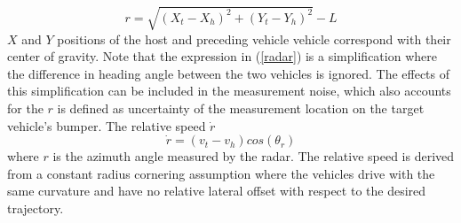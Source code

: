 \documentclass[letterpaper, 10pt, conference]{ieeeconf}  %
\def\eqref#1{(\ref{#1})}
\begin{document}
\begin{equation}\label{radar}
    r = \sqrt{(X_t - X_h)^2 + (Y_t - Y_h)^2} - L 
\end{equation}
$X$ and $Y$ positions of the host and preceding vehicle vehicle
 correspond with their center of gravity. Note that the expression in \eqref{radar} is a simplification
 where the difference in heading angle between the two vehicles is ignored. The effects of
 this simplification can be included in the measurement noise, which also accounts for the
 $r$ is defined as uncertainty of the measurement location on the target vehicle's bumper. The relative speed $\dot{r}$
 \begin{equation}\label{radar_speed}
     \dot{r} = (v_t - v_h) cos(\theta_r)
 \end{equation}
where $r$ is the azimuth angle measured by the radar. The relative speed is derived from a
 constant radius cornering assumption where the vehicles drive with the same curvature
 and have no relative lateral offset with respect to the desired trajectory.


 


\end{document}
